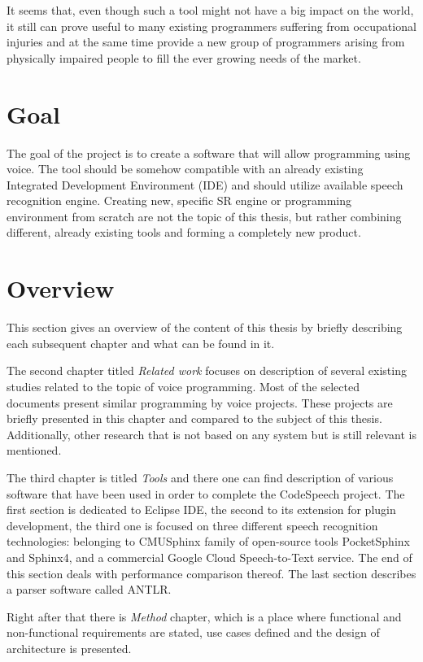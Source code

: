 It seems that, even though such a tool might not have a big impact on the world, it still can prove useful to many existing programmers suffering from occupational injuries and at the same time provide a new group of programmers arising from physically impaired people to fill the ever growing needs of the market.

\section{Goal}
The goal of the project is to create a software that will allow programming using voice. The tool should be somehow compatible with an already existing Integrated Development Environment (IDE) and should utilize available speech recognition engine. Creating new, specific SR engine or programming environment from scratch are not the topic of this thesis, but rather combining different, already existing tools and forming a completely new product. 

\section{Overview}
This section gives an overview of the content of this thesis by briefly describing each subsequent chapter and what can be found in it.

The second chapter titled \textit{Related work} focuses on description of several existing studies related to the topic of voice programming. Most of the selected documents present similar programming by voice projects. These projects are briefly presented in this chapter and compared to the subject of this thesis. Additionally, other research that is not based on any system but is still relevant is mentioned.

The third chapter is titled \textit{Tools} and there one can find description of various software that have been used in order to complete the CodeSpeech project. The first section is dedicated to Eclipse IDE, the second to its extension for plugin development, the third one is focused on three different speech recognition technologies: belonging to CMUSphinx family of open-source tools PocketSphinx and Sphinx4, and a commercial Google Cloud Speech-to-Text service. The end of this section deals with performance comparison thereof. The last section describes a parser software called ANTLR.

Right after that there is \textit{Method} chapter, which is a place where functional and non-functional requirements are stated, use cases defined and the design of architecture is presented. 

